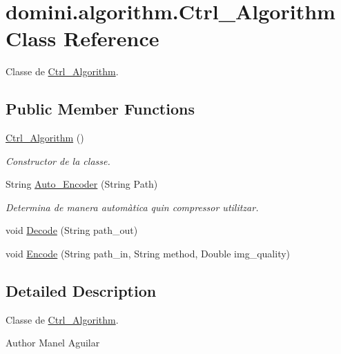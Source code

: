 \hypertarget{classdomini_1_1algorithm_1_1Ctrl__Algorithm}{}\section{domini.\+algorithm.\+Ctrl\+\_\+\+Algorithm Class Reference}
\label{classdomini_1_1algorithm_1_1Ctrl__Algorithm}


Classe de \hyperlink{classdomini_1_1algorithm_1_1Ctrl__Algorithm}{Ctrl\+\_\+\+Algorithm}.  


\subsection*{Public Member Functions}
\begin{DoxyCompactItemize}
\item 
\hyperlink{classdomini_1_1algorithm_1_1Ctrl__Algorithm_aa625781819b57512a3e42df15a3b2ffb}{Ctrl\+\_\+\+Algorithm} ()
\begin{DoxyCompactList}\small\item\em Constructor de la classe. \end{DoxyCompactList}\item 
String \hyperlink{classdomini_1_1algorithm_1_1Ctrl__Algorithm_a6f7a706e07d4e6f8c1ea293d06e17318}{Auto\+\_\+\+Encoder} (String Path)
\begin{DoxyCompactList}\small\item\em Determina de manera automàtica quin compressor utilitzar. \end{DoxyCompactList}\item 
void \hyperlink{classdomini_1_1algorithm_1_1Ctrl__Algorithm_a344b213ee2eb3e0ed3306883624c5128}{Decode} (String path\+\_\+out)
\item 
void \hyperlink{classdomini_1_1algorithm_1_1Ctrl__Algorithm_ac03e09b1fd22f0857bf766fc692efc33}{Encode} (String path\+\_\+in, String method, Double img\+\_\+quality)
\end{DoxyCompactItemize}


\subsection{Detailed Description}
Classe de \hyperlink{classdomini_1_1algorithm_1_1Ctrl__Algorithm}{Ctrl\+\_\+\+Algorithm}. 

\begin{DoxyAuthor}{Author}
Manel Aguilar 
\end{DoxyAuthor}


